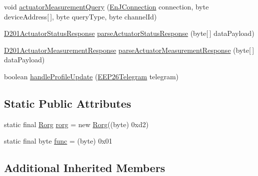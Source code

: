 \begin{DoxyCompactItemize}
\item 
void \hyperlink{classit_1_1polito_1_1elite_1_1enocean_1_1enj_1_1eep_1_1eep26_1_1_d2_1_1_d201_1_1_d201_a6364e553613275986e97b41db20a5737}{actuator\+Measurement\+Query} (\hyperlink{classit_1_1polito_1_1elite_1_1enocean_1_1enj_1_1communication_1_1_en_j_connection}{En\+J\+Connection} connection, byte device\+Address\mbox{[}$\,$\mbox{]}, byte query\+Type, byte channel\+Id)
\item 
\hyperlink{classit_1_1polito_1_1elite_1_1enocean_1_1enj_1_1eep_1_1eep26_1_1_d2_1_1_d201_1_1_d201_actuator_status_response}{D201\+Actuator\+Status\+Response} \hyperlink{classit_1_1polito_1_1elite_1_1enocean_1_1enj_1_1eep_1_1eep26_1_1_d2_1_1_d201_1_1_d201_af4395903eff55ec22792cb1d7ed677fd}{parse\+Actuator\+Status\+Response} (byte\mbox{[}$\,$\mbox{]} data\+Payload)
\item 
\hyperlink{classit_1_1polito_1_1elite_1_1enocean_1_1enj_1_1eep_1_1eep26_1_1_d2_1_1_d201_1_1_d201_actuator_measurement_response}{D201\+Actuator\+Measurement\+Response} \hyperlink{classit_1_1polito_1_1elite_1_1enocean_1_1enj_1_1eep_1_1eep26_1_1_d2_1_1_d201_1_1_d201_a3667af356bcce85d053e430ecdc94241}{parse\+Actuator\+Measurement\+Response} (byte\mbox{[}$\,$\mbox{]} data\+Payload)
\item 
boolean \hyperlink{classit_1_1polito_1_1elite_1_1enocean_1_1enj_1_1eep_1_1eep26_1_1_d2_1_1_d201_1_1_d201_a19b8198d4682724fa4dd2a9f121fcfda}{handle\+Profile\+Update} (\hyperlink{classit_1_1polito_1_1elite_1_1enocean_1_1enj_1_1eep_1_1eep26_1_1telegram_1_1_e_e_p26_telegram}{E\+E\+P26\+Telegram} telegram)
\end{DoxyCompactItemize}
\subsection*{Static Public Attributes}
\begin{DoxyCompactItemize}
\item 
static final \hyperlink{classit_1_1polito_1_1elite_1_1enocean_1_1enj_1_1eep_1_1_rorg}{Rorg} \hyperlink{classit_1_1polito_1_1elite_1_1enocean_1_1enj_1_1eep_1_1eep26_1_1_d2_1_1_d201_1_1_d201_a3260adfec1c9c4541987347b8bdb630a}{rorg} = new \hyperlink{classit_1_1polito_1_1elite_1_1enocean_1_1enj_1_1eep_1_1_rorg}{Rorg}((byte) 0xd2)
\item 
static final byte \hyperlink{classit_1_1polito_1_1elite_1_1enocean_1_1enj_1_1eep_1_1eep26_1_1_d2_1_1_d201_1_1_d201_a7486b7dc81e2aaf72207f3d1337da1ac}{func} = (byte) 0x01
\end{DoxyCompactItemize}
\subsection*{Additional Inherited Members}


